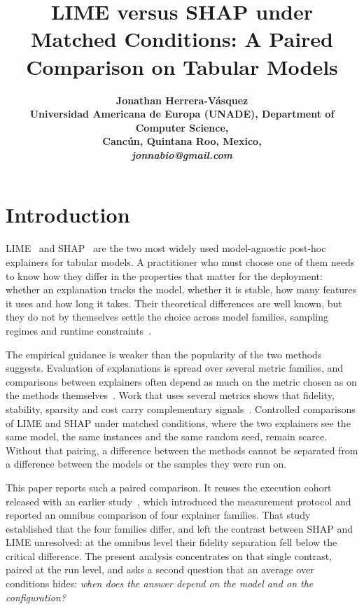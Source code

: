 \documentclass{cleiej}
\title{LIME versus SHAP under Matched Conditions: A Paired Comparison on
Tabular Models}
\author{
\bf Jonathan Herrera-V\'asquez\\
Universidad Americana de Europa (UNADE), Department of Computer Science,\\
Canc\'un, Quintana Roo, Mexico,\\
\it jonnabio@gmail.com
}
\begin{document}
\maketitle

\begin{abstract}
\noindent

\end{abstract}


\section{Introduction}
\label{sec:intro}

LIME~\cite{ribeiro2016why} and SHAP~\cite{lundberg2017unified} are the two
most widely used model-agnostic post-hoc explainers for tabular models. A
practitioner who must choose one of them needs to know how they differ in
the properties that matter for the deployment: whether an explanation tracks
the model, whether it is stable, how many features it uses and how long it
takes. Their theoretical differences are well known, but they do not by
themselves settle the choice across model families, sampling regimes and
runtime constraints~\cite{retzlaff2024posthoc,ali2023trustworthy}.

The empirical guidance is weaker than the popularity of the two methods
suggests. Evaluation of explanations is spread over several metric
families, and comparisons between explainers often depend as much on the
metric chosen as on the methods
themselves~\cite{nauta2023anecdotal,canha2025benchmark,longo2024manifesto}.
Work that uses several metrics shows that fidelity, stability, sparsity and
cost carry complementary
signals~\cite{pawlicki2024metrics,zheng2025ffidelity}. Controlled
comparisons of LIME and SHAP under matched conditions, where the two
explainers see the same model, the same instances and the same random seed,
remain scarce. Without that pairing, a difference between the methods cannot
be separated from a difference between the models or the samples they were
run on.

This paper reports such a paired comparison. It reuses the execution cohort
released with an earlier study~\cite{herrera2026framework}, which introduced
the measurement protocol and reported an omnibus comparison of four
explainer families. That study established that the four families differ,
and left the contrast between SHAP and LIME unresolved: at the omnibus level
their fidelity separation fell below the critical difference. The present
analysis concentrates on that single contrast, paired at the run level, and
asks a second question that an average over conditions hides: \emph{when
does the answer depend on the model and on the configuration?}
\end{document}
